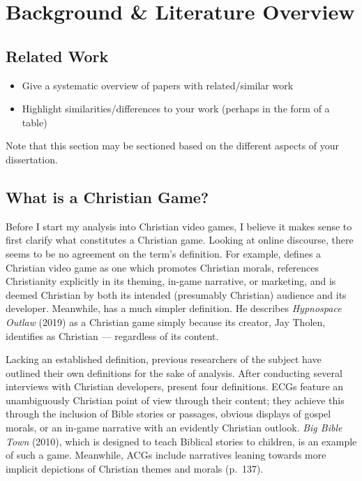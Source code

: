 \chapter{Background \& Literature Overview}


\section{Related Work}

  \begin{itemize}
   \item Give a systematic overview of papers with related/similar work
   \item Highlight similarities/differences to your work (perhaps in the form of a table)
  \end{itemize}

  Note that this section may be sectioned based on the different aspects of your dissertation.
\fi

\section{What is a Christian Game?}

Before I start my analysis into Christian video games, I believe it makes sense to first clarify what constitutes a Christian game. Looking at online discourse, there seems to be no agreement on the term's definition. For example, \textcite{moon_channel_why_2023} 
defines a Christian video game as one which promotes Christian morals, references Christianity explicitly in its theming, in-game narrative, or marketing, and is deemed Christian by both its intended (presumably Christian) audience and its developer. Meanwhile, \textcite{hartgrove_why_2022} has a much simpler definition. He describes \textit{Hypnospace Outlaw} (2019) as a Christian game simply because its creator, Jay Tholen, identifies as Christian --- regardless of its content.

Lacking an established definition, previous researchers of the subject have outlined their own definitions for the sake of analysis. After conducting several interviews with Christian developers, \textcite{schut_making_2013} present four definitions. \acp{ECG} feature an unambiguously Christian point of view through their content; they achieve this through the inclusion of Bible stories or passages, obvious displays of gospel morals, or an in-game narrative with an evidently Christian outlook. \textit{Big Bible Town} (2010), which is designed to teach Biblical stories to children, is an example of such a game. Meanwhile, \acp{ACG} include narratives leaning towards more implicit depictions of Christian themes and morals (p.\ 137). 

